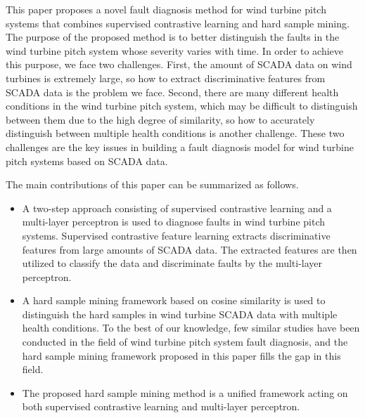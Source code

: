 \documentclass[lettersize,journal]{IEEEtran}
\begin{document}
This paper proposes a novel fault diagnosis method for wind turbine pitch systems that combines supervised contrastive learning and hard sample mining. The purpose of the proposed method is to better distinguish the faults in the wind turbine pitch system whose severity varies with time. In order to achieve this purpose, we face two challenges. First, the amount of SCADA data on wind turbines is extremely large, so how to extract discriminative features from SCADA data is the problem we face. Second, there are many different health conditions in the wind turbine pitch system, which may be difficult to distinguish between them due to the high degree of similarity, so how to accurately distinguish between multiple health conditions is another challenge. These two challenges are the key issues in building a fault diagnosis model for wind turbine pitch systems based on SCADA data.

The main contributions of this paper can be summarized as follows.
\begin{itemize}
    \item A two-step approach consisting of supervised contrastive learning and a multi-layer perceptron is used to diagnose faults in wind turbine pitch systems. Supervised contrastive feature learning extracts discriminative features from large amounts of SCADA data. The extracted features are then utilized to classify the data and discriminate faults by the multi-layer perceptron.
    \item A hard sample mining framework based on cosine similarity is used to distinguish the hard samples in wind turbine SCADA data with multiple health conditions. To the best of our knowledge, few similar studies have been conducted in the field of wind turbine pitch system fault diagnosis, and the hard sample mining framework proposed in this paper fills the gap in this field.

    \item The proposed hard sample mining method is a unified framework acting on both supervised contrastive learning and multi-layer perceptron.
\end{itemize}
\end{document}
